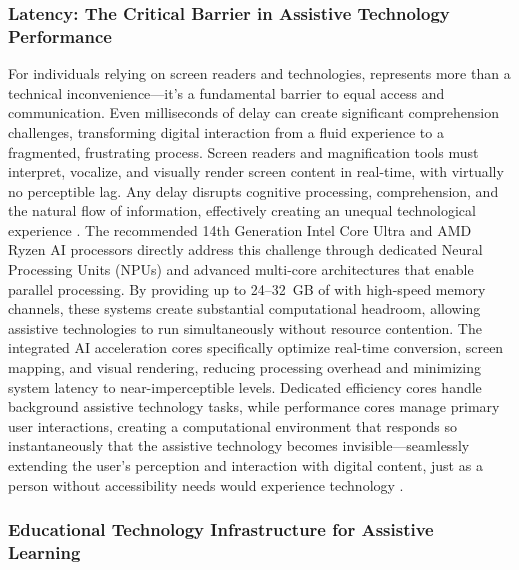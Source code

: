 \subsubsection{Latency: The Critical Barrier in Assistive Technology Performance}

For individuals relying on screen readers and  technologies,  represents more than a technical inconvenience---it's a fundamental barrier to equal access and communication. Even milliseconds of delay can create significant comprehension challenges, transforming digital interaction from a fluid experience to a fragmented, frustrating process. Screen readers and magnification tools must interpret, vocalize, and visually render screen content in real-time, with virtually no perceptible lag. Any delay disrupts cognitive processing, comprehension, and the natural flow of information, effectively creating an unequal technological experience \supercite{Fowler2011ScreenReaderLatency, Nielsen1993UsabilityEngineering}. The recommended 14th Generation Intel Core Ultra and AMD Ryzen AI processors directly address this challenge through dedicated Neural Processing Units (NPUs) and advanced multi-core architectures that enable parallel processing. By providing up to 24--32~GB of  with high-speed memory channels, these systems create substantial computational headroom, allowing assistive technologies to run simultaneously without resource contention. The integrated AI acceleration cores specifically optimize real-time  conversion, screen mapping, and visual rendering, reducing processing overhead and minimizing system latency to near-imperceptible levels. Dedicated efficiency cores handle background assistive technology tasks, while performance cores manage primary user interactions, creating a computational environment that responds so instantaneously that the assistive technology becomes invisible---seamlessly extending the user's perception and interaction with digital content, just as a person without accessibility needs would experience technology \supercite{AIinAccessibility, EducationalEquityReport2024}.


\subsubsection{Educational Technology Infrastructure for Assistive Learning}

